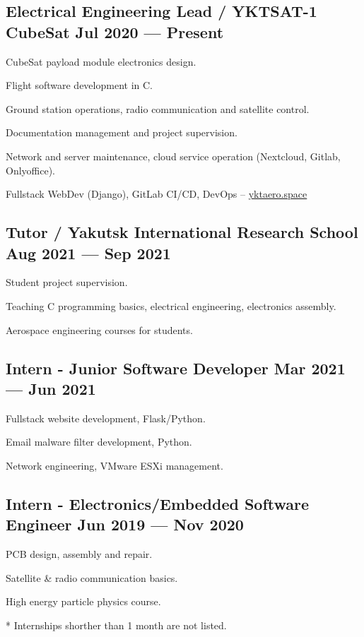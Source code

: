 \documentclass[letter,10pt]{article}
\begin{document}
\subsection{{Electrical Engineering Lead / YKTSAT-1 CubeSat \hfill Jul 2020 --- Present}}
\begin{zitemize}
\item CubeSat payload module electronics design.
\item Flight software development in C.
\item Ground station operations, radio communication and satellite control.
\item Documentation management and project supervision.
\item Network and server maintenance, cloud service operation (Nextcloud, Gitlab, Onlyoffice).
\item Fullstack WebDev (Django), GitLab CI/CD, DevOps -- \url{yktaero.space}
\end{zitemize}

\subsection{{Tutor / Yakutsk International Research School \hfill Aug 2021 --- Sep 2021}}
\begin{zitemize}
\item Student project supervision.
\item Teaching C programming basics, electrical engineering, electronics assembly.
\item Aerospace engineering courses for students.
\end{zitemize}

\subsection{{Intern - Junior Software Developer \hfill Mar 2021 --- Jun 2021}}
\begin{zitemize}
\item Fullstack website development, Flask/Python.
\item Email malware filter development, Python.
\item Network engineering, VMware ESXi management.
\end{zitemize}

\subsection{{Intern - Electronics/Embedded Software Engineer \hfill Jun 2019 --- Nov 2020}}
\begin{zitemize}
\item PCB design, assembly and repair.
\item Satellite \& radio communication basics.
\item High energy particle physics course.
\end{zitemize}

* Internships shorther than 1 month are not listed.
\end{document}
